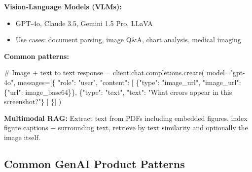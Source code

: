 \documentclass[11pt]{article}
\providecommand{\tightlist}{\setlength{\itemsep}{1pt}\setlength{\parskip}{0pt}}
\newenvironment{Shaded}{\begin{snugshade}}{\end{snugshade}}
\newcommand{\CommentTok}[1]{\textcolor[rgb]{0.48,0.49,0.49}{#1}}
\newcommand{\NormalTok}[1]{\textcolor[rgb]{0.81,0.81,0.76}{#1}}
\newcommand{\OperatorTok}[1]{\textcolor[rgb]{0.81,0.81,0.76}{#1}}
\newcommand{\StringTok}[1]{\textcolor[rgb]{0.96,0.31,0.31}{#1}}
\begin{document}
\textbf{Vision-Language Models (VLMs):}

\begin{itemize}
\tightlist
\item
  GPT-4o, Claude 3.5, Gemini 1.5 Pro, LLaVA
\item
  Use cases: document parsing, image Q\&A, chart analysis, medical imaging
\end{itemize}

\textbf{Common patterns:}


\begin{Shaded}
\begin{Highlighting}[]
\CommentTok{\# Image + text to text}
\NormalTok{response }\OperatorTok{=}\NormalTok{ client.chat.completions.create(}
\NormalTok{    model}\OperatorTok{=}\StringTok{"gpt{-}4o"}\NormalTok{,}
\NormalTok{    messages}\OperatorTok{=}\NormalTok{[\{}
        \StringTok{"role"}\NormalTok{: }\StringTok{"user"}\NormalTok{,}
        \StringTok{"content"}\NormalTok{: [}
\NormalTok{            \{}\StringTok{"type"}\NormalTok{: }\StringTok{"image\_url"}\NormalTok{, }\StringTok{"image\_url"}\NormalTok{: \{}\StringTok{"url"}\NormalTok{: image\_base64\}\},}
\NormalTok{            \{}\StringTok{"type"}\NormalTok{: }\StringTok{"text"}\NormalTok{, }\StringTok{"text"}\NormalTok{: }\StringTok{"What errors appear in this screenshot?"}\NormalTok{\}}
\NormalTok{        ]}
\NormalTok{    \}]}
\NormalTok{)}
\end{Highlighting}
\end{Shaded}

\textbf{Multimodal RAG:} Extract text from PDFs including embedded figures, index figure captions + surrounding text, retrieve by text similarity and optionally the image itself.

\subsection{Common GenAI Product Patterns}\label{common-genai-product-patterns}
\end{document}
